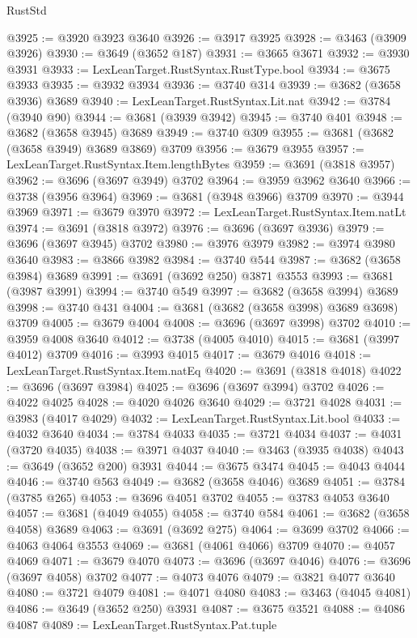 \begin{lexlean}{RustStd}
\begin{coremodule}
@3925 := @3920 @3923 @3640
@3926 := @3917 @3925
@3928 := @3463 (@3909 @3926)
@3930 := @3649 (@3652 @187)
@3931 := @3665 @3671
@3932 := @3930 @3931
@3933 := LexLeanTarget.RustSyntax.RustType.bool
@3934 := @3675 @3933
@3935 := @3932 @3934
@3936 := @3740 @314
@3939 := @3682 (@3658 @3936) @3689
@3940 := LexLeanTarget.RustSyntax.Lit.nat
@3942 := @3784 (@3940 @90)
@3944 := @3681 (@3939 @3942)
@3945 := @3740 @401
@3948 := @3682 (@3658 @3945) @3689
@3949 := @3740 @309
@3955 := @3681 (@3682 (@3658 @3949) @3689 @3869) @3709
@3956 := @3679 @3955
@3957 := LexLeanTarget.RustSyntax.Item.lengthBytes
@3959 := @3691 (@3818 @3957)
@3962 := @3696 (@3697 @3949) @3702
@3964 := @3959 @3962 @3640
@3966 := @3738 (@3956 @3964)
@3969 := @3681 (@3948 @3966) @3709
@3970 := @3944 @3969
@3971 := @3679 @3970
@3972 := LexLeanTarget.RustSyntax.Item.natLt
@3974 := @3691 (@3818 @3972)
@3976 := @3696 (@3697 @3936)
@3979 := @3696 (@3697 @3945) @3702
@3980 := @3976 @3979
@3982 := @3974 @3980 @3640
@3983 := @3866 @3982
@3984 := @3740 @544
@3987 := @3682 (@3658 @3984) @3689
@3991 := @3691 (@3692 @250) @3871 @3553
@3993 := @3681 (@3987 @3991)
@3994 := @3740 @549
@3997 := @3682 (@3658 @3994) @3689
@3998 := @3740 @431
@4004 := @3681 (@3682 (@3658 @3998) @3689 @3698) @3709
@4005 := @3679 @4004
@4008 := @3696 (@3697 @3998) @3702
@4010 := @3959 @4008 @3640
@4012 := @3738 (@4005 @4010)
@4015 := @3681 (@3997 @4012) @3709
@4016 := @3993 @4015
@4017 := @3679 @4016
@4018 := LexLeanTarget.RustSyntax.Item.natEq
@4020 := @3691 (@3818 @4018)
@4022 := @3696 (@3697 @3984)
@4025 := @3696 (@3697 @3994) @3702
@4026 := @4022 @4025
@4028 := @4020 @4026 @3640
@4029 := @3721 @4028
@4031 := @3983 (@4017 @4029)
@4032 := LexLeanTarget.RustSyntax.Lit.bool
@4033 := @4032 @3640
@4034 := @3784 @4033
@4035 := @3721 @4034
@4037 := @4031 (@3720 @4035)
@4038 := @3971 @4037
@4040 := @3463 (@3935 @4038)
@4043 := @3649 (@3652 @200) @3931
@4044 := @3675 @3474
@4045 := @4043 @4044
@4046 := @3740 @563
@4049 := @3682 (@3658 @4046) @3689
@4051 := @3784 (@3785 @265)
@4053 := @3696 @4051 @3702
@4055 := @3783 @4053 @3640
@4057 := @3681 (@4049 @4055)
@4058 := @3740 @584
@4061 := @3682 (@3658 @4058) @3689
@4063 := @3691 (@3692 @275)
@4064 := @3699 @3702
@4066 := @4063 @4064 @3553
@4069 := @3681 (@4061 @4066) @3709
@4070 := @4057 @4069
@4071 := @3679 @4070
@4073 := @3696 (@3697 @4046)
@4076 := @3696 (@3697 @4058) @3702
@4077 := @4073 @4076
@4079 := @3821 @4077 @3640
@4080 := @3721 @4079
@4081 := @4071 @4080
@4083 := @3463 (@4045 @4081)
@4086 := @3649 (@3652 @250) @3931
@4087 := @3675 @3521
@4088 := @4086 @4087
@4089 := LexLeanTarget.RustSyntax.Pat.tuple

\end{coremodule}
\end{lexlean}
